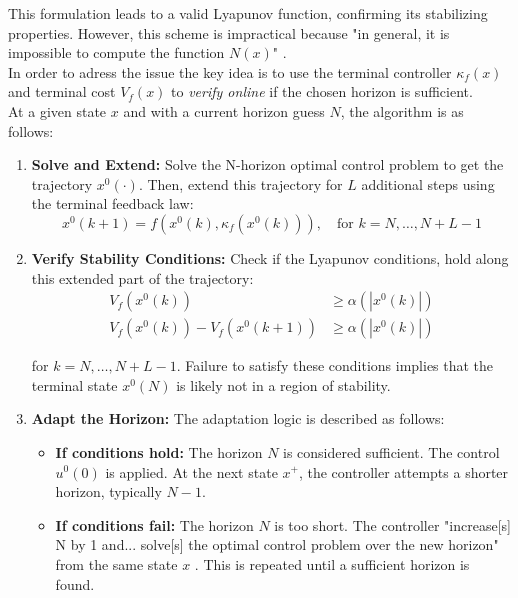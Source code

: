 This formulation leads to a valid Lyapunov function, confirming its stabilizing properties. However, this scheme is impractical because "in general, it is impossible to compute the function $N(x)$" \cite{krener2016adaptive}.
\\
\noindent
In order to adress the issue the key idea is to use the terminal controller $\kappa_f(x)$ and terminal cost $V_f(x)$ to \textit{verify online} if the chosen horizon is sufficient.
\\
\noindent
At a given state $x$ and with a current horizon guess $N$, the algorithm is as follows:
\begin{enumerate}
    \item \textbf{Solve and Extend:} Solve the N-horizon optimal control problem to get the trajectory $x^0(\cdot)$. Then, extend this trajectory for $L$ additional steps using the terminal feedback law:
    \begin{equation}
        x^0(k+1) = f(x^0(k), \kappa_f(x^0(k))), \quad \text{for } k = N, \dots, N+L-1
    \end{equation}
    
    \item \textbf{Verify Stability Conditions:} Check if the Lyapunov conditions, hold along this extended part of the trajectory:
   \begin{subequations}
	\begin{align}
  	  V_f(x^0(k)) &\ge \alpha(|x^0(k)|) \label{eq:Vf_lower_bound} \\
   	 V_f(x^0(k)) - V_f(x^0(k+1)) &\ge \alpha(|x^0(k)|) \label{eq:Vf_decrease}
	\end{align}
   \end{subequations}

    for $k = N, \dots, N+L-1$. Failure to satisfy these conditions implies that the terminal state $x^0(N)$ is likely not in a region of stability.
    
    \item \textbf{Adapt the Horizon:} The adaptation logic is described as follows:
    \begin{itemize}
        \item \textbf{If conditions hold:} The horizon $N$ is considered sufficient. The control $u^0(0)$ is applied. At the next state $x^+$, the controller attempts a shorter horizon, typically $N-1$.
        \item \textbf{If conditions fail:} The horizon $N$ is too short. The controller "increase[s] N by 1 and... solve[s] the optimal control problem over the new horizon" from the same state $x$ \cite{krener2016adaptive}. This is repeated until a sufficient horizon is found.
    \end{itemize}
\end{enumerate}


